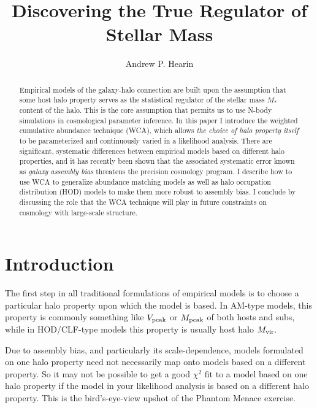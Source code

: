 \documentclass[usenatbib,usegraphicx,letterpaper]{mn2e}
\newcommand{\mvir}{M_{\rm vir}}
\newcommand{\mpeak}{M_{\rm peak}}
\newcommand{\vpeak}{V_{\rm peak}}
\newcommand{\mstar}{M_{\ast}}
\begin{document}
\title[Generalized Galaxy-Halo Modeling]
{Discovering the True Regulator of Stellar Mass}

\author[A.P. Hearin]{Andrew P. Hearin}

\maketitle




\begin{abstract}
Empirical models of the galaxy-halo connection are built upon the assumption that some host halo property serves as the statistical regulator of the stellar mass $\mstar$ content of the halo. This is the core assumption that permits us to use N-body simulations in cosmological parameter inference. In this paper I introduce the weighted cumulative abundance technique (WCA), which allows {\em the choice of halo property itself} to be parameterized and continuously varied in a likelihood analysis. There are significant, systematic differences between empirical models based on different halo properties, and it has recently been shown that the associated systematic error known as {\em galaxy assembly bias} threatens the precision cosmology program.  I describe how to use WCA to  generalize abundance matching models as well as halo occupation distribution (HOD) models to make them more robust to assembly bias. I conclude by discussing the role that the WCA technique will play in future constraints on cosmology with large-scale structure. 
\end{abstract}


\section{Introduction}


The first step in all traditional formulations of empirical models is to choose a particular halo property upon which the model is based. In AM-type models, this property is commonly something like $\vpeak$ or $\mpeak$ of both hosts and subs, while in HOD/CLF-type models this property is usually host halo $\mvir.$ 

Due to assembly bias, and particularly its scale-dependence, models formulated on one halo property need not necessarily map onto models based on a different property. So it may not be possible to get a good $\chi^2$ fit to a model based on one halo property if the model in your likelihood analysis is based on a different halo property. This is the bird's-eye-view upshot of the Phantom Menace exercise. 
\end{document}
